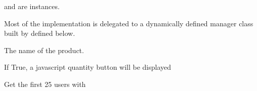 \documentclass[letterpaper,10pt,english]{sphinxmanual}
\begin{document}
\begin{fulllineitems}
\begin{fulllineitems}
 and  are 
instances.

Most of the implementation is delegated to a dynamically defined manager
class built by  defined below.

\end{fulllineitems}


\begin{fulllineitems}
\label{\detokenize{modules/models:gestion.models.Product.name}}
The name of the product.

\end{fulllineitems}


\begin{fulllineitems}
\label{\detokenize{modules/models:gestion.models.Product.needQuantityButton}}
If True, a javascript quantity button will be displayed

\end{fulllineitems}


\begin{fulllineitems}
\label{\detokenize{modules/models:gestion.models.Product.objects}}
\end{fulllineitems}


\begin{fulllineitems}
\label{\detokenize{modules/models:gestion.models.Product.ranking}}
Get the first 25 users with 


\end{fulllineitems}
\end{fulllineitems}
\end{document}
